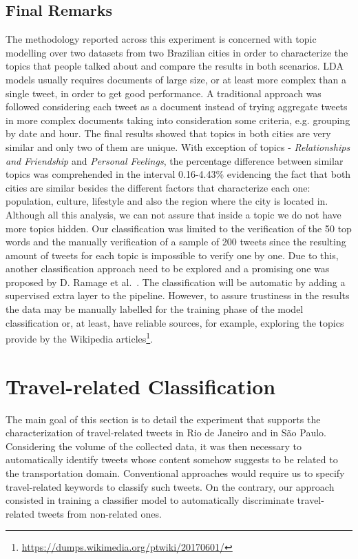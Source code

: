 \subsection{Final Remarks}
The methodology reported across this experiment is concerned with topic modelling over two datasets from two Brazilian cities in order to characterize the topics that people talked about and compare the results in both scenarios. LDA models usually requires documents of large size, or at least more complex than a single tweet, in order to get good performance. A traditional approach was followed considering each tweet as a document instead of trying aggregate tweets in more complex documents taking into consideration some criteria, e.g. grouping by date and hour. The final results showed that topics in both cities are very similar and only two of them are unique. With exception of topics - \textit{Relationships and Friendship} and \textit{Personal Feelings}, the percentage difference between similar topics was comprehended in the interval 0.16-4.43\% evidencing the fact that both cities are similar besides the different factors that characterize each one: population, culture, lifestyle and also the region where the city is located in. Although all this analysis, we can not assure that inside a topic we do not have more topics hidden. Our classification was limited to the verification of the 50 top words and the manually verification of a sample of 200 tweets since the resulting amount of tweets for each topic is impossible to verify one by one. Due to this, another classification approach need to be explored and a promising one was proposed by D. Ramage et al.~\cite{ramage2010characterizing}. The classification will be automatic by adding a supervised extra layer to the pipeline. However, to assure trustiness in the results the data may be manually labelled for the training phase of the model classification or, at least, have reliable sources, for example, exploring the topics provide by the Wikipedia articles\footnote{\url{https://dumps.wikimedia.org/ptwiki/20170601/}}.

\section{Travel-related Classification}\label{sec:travel_related_classification}
The main goal of this section is to detail the experiment that supports the characterization of travel-related tweets in Rio de Janeiro and in São Paulo. Considering the volume of the collected data, it was then necessary to automatically identify tweets whose content somehow suggests to be related to the transportation domain. Conventional approaches would require us to specify travel-related keywords to classify such tweets. On the contrary, our approach consisted in training a classifier model to automatically discriminate travel-related tweets from non-related ones. 

